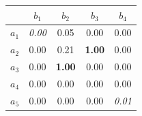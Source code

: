 \begin{tabular}{c|cccc}
 & $b_{1}$ & $b_{2}$ & $b_{3}$ & $b_{4}$ \\ \hline
$a_{1}$ & \textit{0.00} & 0.05 & 0.00 & 0.00 \\
$a_{2}$ & 0.00 & 0.21 & \textbf{1.00} & 0.00 \\
$a_{3}$ & 0.00 & \textbf{1.00} & 0.00 & 0.00 \\
$a_{4}$ & 0.00 & 0.00 & 0.00 & 0.00 \\
$a_{5}$ & 0.00 & 0.00 & 0.00 & \textit{0.01} \\
\end{tabular}
